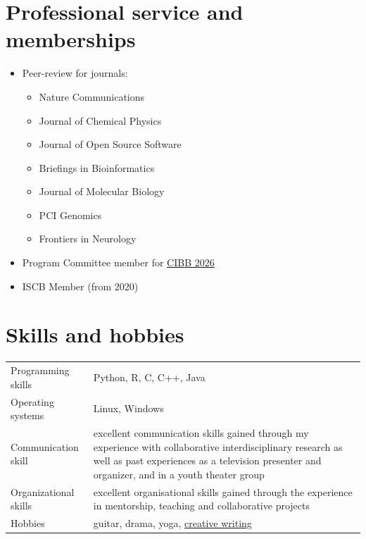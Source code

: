 \documentclass[a4paper,12pt]{article}
\begin{document}

\section{Professional service and memberships}
\begin{itemize}
    \item Peer-review for journals:
    \begin{itemize}
        \item Nature Communications
        \item Journal of Chemical Physics
        \item Journal of Open Source Software
        \item Briefings in Bioinformatics
        \item Journal of Molecular Biology
        \item PCI Genomics
        \item Frontiers in Neurology
    \end{itemize}
    \item Program Committee member for \href{https://cibb2026.teralab.ai/}{CIBB 2026}
    \item ISCB Member (from 2020)
\end{itemize}


\section{Skills and hobbies}
\begin{tabularx}{\linewidth}{@{}l X@{}}
Programming skills &  \normalsize{Python, R, C, C++, Java}\\
Operating systems &  \normalsize{Linux, Windows}\\
Communication skill & \normalsize{excellent communication skills gained through my experience with collaborative interdisciplinary research as well as past experiences as a television presenter and organizer, and in a youth theater group} \\
Organizational skills  &  \normalsize{excellent organisational skills gained through the experience in mentorship, teaching and collaborative projects}\\  
Hobbies &  \normalsize{guitar, drama, yoga, \href{http://blablablatruc.blogspot.com/}{creative writing}}\\
\end{tabularx}

\vfill
{}
\end{document}
